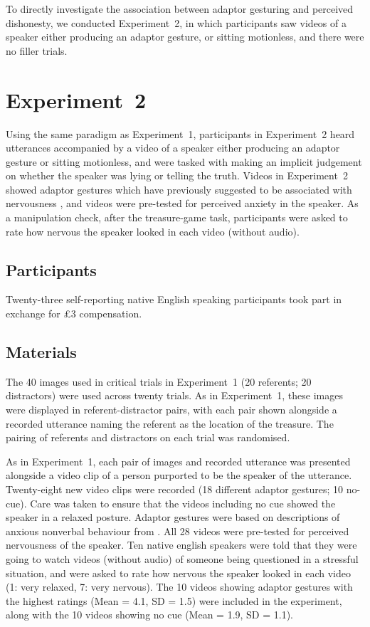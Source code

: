 \documentclass[a4paper,man,natbib]{apa6}
\begin{document}
To directly investigate the association between adaptor gesturing and perceived dishonesty, we conducted Experiment~2, in which participants saw videos of a speaker either producing an adaptor gesture, or sitting motionless, and there were no filler trials.

\section{Experiment~2}
Using the same paradigm as Experiment~1, participants in Experiment~2 heard utterances accompanied by a video of a speaker either producing an adaptor gesture or sitting motionless, and were tasked with making an implicit judgement on whether the speaker was lying or telling the truth.
Videos in Experiment~2 showed adaptor gestures which have previously suggested to be associated with nervousness \citep[See][]{Gregersen2005}, and videos were pre-tested for perceived anxiety in the speaker.
As a manipulation check, after the treasure-game task, participants were asked to rate how nervous the speaker looked in each video (without audio).

\subsection{Participants}
Twenty-three self-reporting native English speaking participants took part in exchange for \pounds{}3 compensation.


\subsection{Materials}
The 40 images used in critical trials in Experiment~1 (20 referents; 20 distractors) were used across twenty trials.
As in Experiment~1, these images were displayed in referent-distractor pairs, with each pair shown alongside a recorded utterance naming the referent as the location of the treasure.
The pairing of referents and distractors on each trial was randomised.

As in Experiment~1, each pair of images and recorded utterance was presented alongside a video clip of a person purported to be the speaker of the utterance.
Twenty-eight new video clips were recorded (18 different adaptor gestures; 10 no-cue). 
Care was taken to ensure that the videos including no cue showed the speaker in a relaxed posture. 
Adaptor gestures were based on descriptions of anxious nonverbal behaviour from \citet{Gregersen2005}.
All 28 videos were pre-tested for perceived nervousness of the speaker.
Ten native english speakers were told that they were going to watch videos (without audio) of someone being questioned in a stressful situation, and were asked to rate how nervous the speaker looked in each video (1: very relaxed, 7: very nervous). 
The 10 videos showing adaptor gestures with the highest ratings (Mean = 4.1, SD = 1.5) were included in the experiment, along with the 10 videos showing no cue (Mean = 1.9, SD = 1.1).
\end{document}
